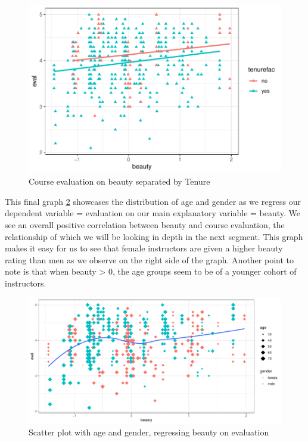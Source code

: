 \documentclass[
  12 pt,
]{article}
\begin{document}
\begin{figure}[H]

{\centering \includegraphics{18205420_Markdown--1-_files/figure-latex/rel3-1} 

}

\caption{Course evaluation on beauty separated by Tenure}\label{fig:rel3}
\end{figure}

\newpage

This final graph \ref{fig:rel4} showcases the distribution of age and gender as we regress our dependent variable = evaluation on our main explanatory variable = beauty.
We see an overall positive correlation between beauty and course evaluation, the relationship of which we will be looking in depth in the next segment. This graph makes it easy for us to see that female instructors are given a higher beauty rating than men as we observe on the right side of the graph. Another point to note is that when beauty \textgreater{} 0, the age groups seem to be of a younger cohort of instructors.

\begin{figure}[H]

{\centering \includegraphics{18205420_Markdown--1-_files/figure-latex/rel4-1} 

}

\caption{Scatter plot with age and gender, regressing beauty on evaluation}\label{fig:rel4}
\end{figure}
\end{document}

